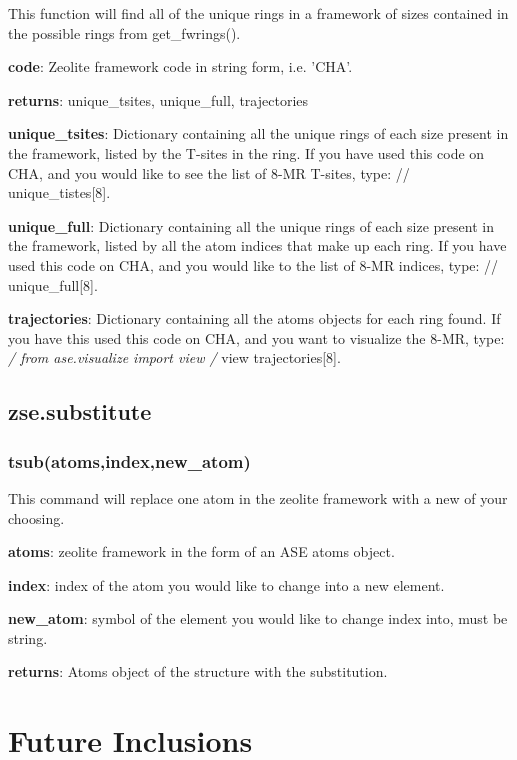 \documentclass[11pt]{article}
\begin{document}
This function will find all of the unique rings in a framework of sizes contained in the possible rings from get\_fwrings().

\textbf{code}: Zeolite framework code in string form, i.e. 'CHA'. 

\textbf{returns}: unique\_tsites, unique\_full, trajectories

\textbf{unique\_tsites}: Dictionary containing all the unique rings of each size present in the framework, listed by the T-sites in the ring. If you have used this code on CHA, and you would like to see the list of 8-MR T-sites, type: // unique\_tistes[8]. 

\textbf{unique\_full}: Dictionary containing all the unique rings of each size present in the framework, listed by all the atom indices that make up each ring. If you have used this code on CHA, and you would like to the list of 8-MR indices, type: // unique\_full[8].

\textbf{trajectories}: Dictionary containing all the atoms objects for each ring found. If you have this used this code on CHA, and you want to visualize the 8-MR, type: \emph{/ from ase.visualize import view /} view trajectories[8].

\subsection{zse.substitute}
\label{sec:orgac73721}

\subsubsection{tsub(atoms,index,new\_atom)}
\label{sec:orgeecaf80}

This command will replace one atom in the zeolite framework with a new of your choosing.

\textbf{atoms}: zeolite framework in the form of an ASE atoms object.

\textbf{index}: index of the atom you would like to change into a new element.

\textbf{new\_atom}: symbol of the element you would like to change index into, must be string.

\textbf{returns}: Atoms object of the structure with the substitution. 
\section{Future Inclusions}
\label{sec:orge1d632f}
\end{document}
